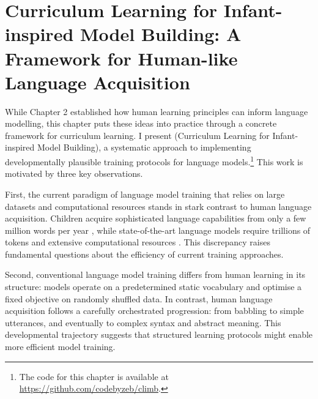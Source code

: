 \chapter{Curriculum Learning for Infant-inspired Model Building: A Framework for Human-like Language Acquisition}
\label{chapter:CLIMB}





While Chapter 2 established how human learning principles can inform language modelling, this chapter puts these ideas into practice through a concrete framework for curriculum learning. I present \climb (Curriculum Learning for Infant-inspired Model Building), a systematic approach to implementing developmentally plausible training protocols for language models.\footnote{The code for this chapter is available at \url{https://github.com/codebyzeb/climb}.} This work is motivated by three key observations.

First, the current paradigm of language model training that relies on large datasets and computational resources stands in stark contrast to human language acquisition. Children acquire sophisticated language capabilities from only a few million words per year \citep{gilkerson2017mapping}, while state-of-the-art language models require trillions of tokens and extensive computational resources \citep{zhang2021need, zhao2023llmsurvey}. This discrepancy raises fundamental questions about the efficiency of current training approaches.

Second, conventional language model training differs from human learning in its structure: models operate on a predetermined static vocabulary and optimise a fixed objective on randomly shuffled data. In contrast, human language acquisition follows a carefully orchestrated progression: from babbling to simple utterances, and eventually to complex syntax and abstract meaning. This developmental trajectory suggests that structured learning protocols might enable more efficient model training.

